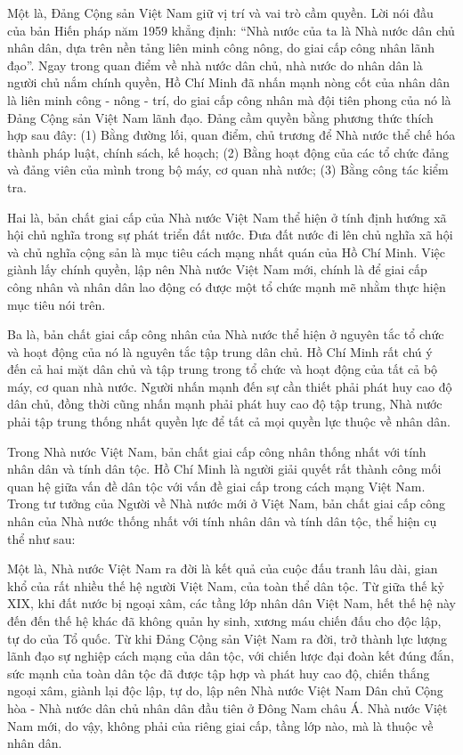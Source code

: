 Một là, Đảng Cộng sản Việt Nam giữ vị trí và vai trò cầm quyền. Lời nói đầu của bản Hiến pháp năm 1959 khẳng định: ``Nhà nước của ta là Nhà nước dân chủ nhân dân, dựa trên nền tảng liên minh công nông, do giai cấp công nhân lãnh đạo''. Ngay trong quan điểm về nhà nước dân chủ, nhà nước do nhân dân là người chủ nắm chính quyền, Hồ Chí Minh đã nhấn mạnh nòng cốt của nhân dân là liên minh công - nông - trí, do giai cấp công nhân mà đội tiên phong của nó là Đảng Cộng sản Việt Nam lãnh đạo. Đảng cầm quyền bằng phương thức thích hợp sau đây: (1) Bằng đường lối, quan điểm, chủ trương để Nhà nước thể chế hóa thành pháp luật, chính sách, kế hoạch; (2) Bằng hoạt động của các tổ chức đảng và đảng viên của mình trong bộ máy, cơ quan nhà nước; (3) Bằng công tác kiểm tra.

Hai là, bản chất giai cấp của Nhà nước Việt Nam thể hiện ở tính định hướng xã hội chủ nghĩa trong sự phát triển đất nước. Đưa đất nước đi lên chủ nghĩa xã hội và chủ nghĩa cộng sản là mục tiêu cách mạng nhất quán của Hồ Chí Minh. Việc giành lấy chính quyền, lập nên Nhà nước Việt Nam mới, chính là để giai cấp công nhân và nhân dân lao động có được một tổ chức mạnh mẽ nhằm thực hiện mục tiêu nói trên.

Ba là, bản chất giai cấp công nhân của Nhà nước thể hiện ở nguyên tắc tổ chức và hoạt động của nó là nguyên tắc tập trung dân chủ. Hồ Chí Minh rất chú ý đến cả hai mặt dân chủ và tập trung trong tổ chức và hoạt động của tất cả bộ máy, cơ quan nhà nước. Người nhấn mạnh đến sự cần thiết phải phát huy cao độ dân chủ, đồng thời cũng nhấn mạnh phải phát huy cao độ tập trung, Nhà nước phải tập trung thống nhất quyền lực để tất cả mọi quyền lực thuộc về nhân dân.

Trong Nhà nước Việt Nam, bản chất giai cấp công nhân thống nhất với tính nhân dân và tính dân tộc. Hồ Chí Minh là người giải quyết rất thành công mối quan hệ giữa vấn đề dân tộc với vấn đề giai cấp trong cách mạng Việt Nam. Trong tư tưởng của Người về Nhà nước mới ở Việt Nam, bản chất giai cấp công nhân của Nhà nước thống nhất với tính nhân dân và tính dân tộc, thể hiện cụ thể như sau:

Một là, Nhà nước Việt Nam ra đời là kết quả của cuộc đấu tranh lâu dài, gian khổ của rất nhiều thế hệ người Việt Nam, của toàn thể dân tộc. Từ giữa thế kỷ XIX, khi đất nước bị ngoại xâm, các tầng lớp nhân dân Việt Nam, hết thế hệ này đến đến thế hệ khác đã không quản hy sinh, xương máu chiến đấu cho độc lập, tự do của Tổ quốc. Từ khi Đảng Cộng sản Việt Nam ra đời, trở thành lực lượng lãnh đạo sự nghiệp cách mạng của dân tộc, với chiến lược đại đoàn kết đúng đắn, sức mạnh của toàn dân tộc đã được tập hợp và phát huy cao độ, chiến thắng ngoại xâm, giành lại độc lập, tự do, lập nên Nhà nước Việt Nam Dân chủ Cộng hòa - Nhà nước dân chủ nhân dân đầu tiên ở Đông Nam châu Á. Nhà nước Việt Nam mới, do vậy, không phải của riêng giai cấp, tầng lớp nào, mà là thuộc về nhân dân.

